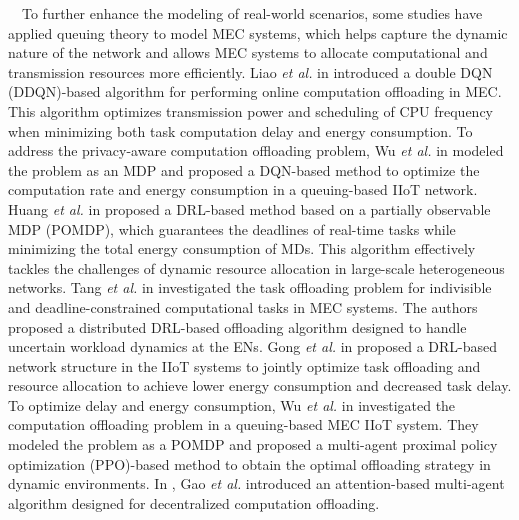 \documentclass[12pt,draftclsnofoot,onecolumn]{IEEEtran}
\newenvironment{my}[2]%
{\begin{list}{}%
{\setlength{\rightmargin}{#1}\setlength{\leftmargin}{#2}}%


 \item[]{}

} {\end{list}}
\begin{document}
\begin{enumerate}
\begin{my}{1cm}{1cm}
{		\,\,\,\,
		To further enhance the modeling of real-world scenarios, some studies have applied queuing theory to model MEC systems, which helps capture the dynamic nature of the network and allows MEC systems to allocate computational and transmission resources more efficiently.
		Liao \textit{et al.} in \cite{liao2023online} introduced a double DQN (DDQN)-based algorithm for performing online computation offloading in MEC. This algorithm optimizes transmission power and scheduling of CPU frequency when minimizing both task computation delay and energy consumption. 
		To address the privacy-aware computation offloading problem, Wu \textit{et al.} in \cite{wu2024combining} modeled the problem as an MDP and proposed a DQN-based method to optimize the computation rate and energy consumption in a queuing-based IIoT network.
		Huang \textit{et al.} in \cite{huang2021deadline} proposed a DRL-based method based on a partially observable MDP (POMDP), which guarantees the deadlines of real-time tasks while minimizing the total energy consumption of MDs. This algorithm effectively tackles the challenges of dynamic resource allocation in large-scale heterogeneous networks. 
		Tang \textit{et al.} in \cite{9253665} investigated the task offloading problem for indivisible and deadline-constrained computational tasks in MEC systems. The authors proposed a distributed DRL-based offloading algorithm designed to handle uncertain workload dynamics at the ENs. 
		Gong \textit{et al.} in \cite{gong2022edge} proposed a DRL-based network structure in the IIoT systems to jointly optimize task offloading and resource allocation to achieve lower energy consumption and decreased task delay.
		To optimize delay and energy consumption, Wu \textit{et al.} in \cite{wu2023multi} investigated the computation offloading problem in a queuing-based MEC IIoT system. They modeled the problem as a POMDP and proposed a multi-agent proximal policy optimization (PPO)-based method to obtain the optimal offloading strategy in dynamic environments.
		In \cite{gao2022large}, Gao \textit{et al.} introduced an attention-based multi-agent algorithm designed for decentralized computation offloading.
		\begin{table}[tbp]\textcolor{blue}{
				\renewcommand{\arraystretch}{0.2}
				\captionsetup{name=TABLE}
				\caption{\textcolor{blue}{Comparison of Related Works \vspace{4mm}}}
				}
\end{table}}
\end{my}
\end{enumerate}
\end{document}
